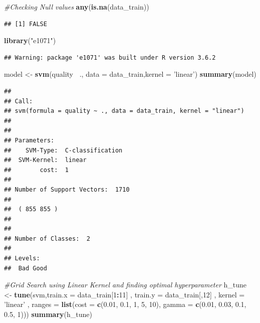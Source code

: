 \documentclass[]{article}
\newenvironment{Shaded}{\begin{snugshade}}{\end{snugshade}}
\newcommand{\CommentTok}[1]{\textcolor[rgb]{0.56,0.35,0.01}{\textit{#1}}}
\newcommand{\DataTypeTok}[1]{\textcolor[rgb]{0.13,0.29,0.53}{#1}}
\newcommand{\DecValTok}[1]{\textcolor[rgb]{0.00,0.00,0.81}{#1}}
\newcommand{\FloatTok}[1]{\textcolor[rgb]{0.00,0.00,0.81}{#1}}
\newcommand{\KeywordTok}[1]{\textcolor[rgb]{0.13,0.29,0.53}{\textbf{#1}}}
\newcommand{\NormalTok}[1]{#1}
\newcommand{\OperatorTok}[1]{\textcolor[rgb]{0.81,0.36,0.00}{\textbf{#1}}}
\newcommand{\StringTok}[1]{\textcolor[rgb]{0.31,0.60,0.02}{#1}}
\begin{document}
\begin{Shaded}
\begin{Highlighting}[]
\CommentTok{#Checking Null values}
\KeywordTok{any}\NormalTok{(}\KeywordTok{is.na}\NormalTok{(data_train))}
\end{Highlighting}
\end{Shaded}

\begin{verbatim}
## [1] FALSE
\end{verbatim}

\begin{Shaded}
\begin{Highlighting}[]
\KeywordTok{library}\NormalTok{(}\StringTok{"e1071"}\NormalTok{)}
\end{Highlighting}
\end{Shaded}

\begin{verbatim}
## Warning: package 'e1071' was built under R version 3.6.2
\end{verbatim}

\begin{Shaded}
\begin{Highlighting}[]
\NormalTok{model <-}\StringTok{ }\KeywordTok{svm}\NormalTok{(quality }\OperatorTok{~}\NormalTok{., }\DataTypeTok{data =}\NormalTok{ data_train,}\DataTypeTok{kernel =} \StringTok{'linear'}\NormalTok{)}
\KeywordTok{summary}\NormalTok{(model)}
\end{Highlighting}
\end{Shaded}

\begin{verbatim}
## 
## Call:
## svm(formula = quality ~ ., data = data_train, kernel = "linear")
## 
## 
## Parameters:
##    SVM-Type:  C-classification 
##  SVM-Kernel:  linear 
##        cost:  1 
## 
## Number of Support Vectors:  1710
## 
##  ( 855 855 )
## 
## 
## Number of Classes:  2 
## 
## Levels: 
##  Bad Good
\end{verbatim}

\begin{Shaded}
\begin{Highlighting}[]
\CommentTok{#Grid Search using Linear Kernel and finding optimal hyperparameter}
\NormalTok{h_tune <-}\StringTok{ }\KeywordTok{tune}\NormalTok{(svm,}\DataTypeTok{train.x =}\NormalTok{ data_train[}\DecValTok{1}\OperatorTok{:}\DecValTok{11}\NormalTok{] , }\DataTypeTok{train.y =}\NormalTok{ data_train[,}\DecValTok{12}\NormalTok{] ,}
               \DataTypeTok{kernel =} \StringTok{'linear'}\NormalTok{  ,}
               \DataTypeTok{ranges =} \KeywordTok{list}\NormalTok{(}\DataTypeTok{cost =} \KeywordTok{c}\NormalTok{(}\FloatTok{0.01}\NormalTok{, }\FloatTok{0.1}\NormalTok{, }\DecValTok{1}\NormalTok{, }\DecValTok{5}\NormalTok{, }\DecValTok{10}\NormalTok{), }\DataTypeTok{gamma =} \KeywordTok{c}\NormalTok{(}\FloatTok{0.01}\NormalTok{, }\FloatTok{0.03}\NormalTok{, }\FloatTok{0.1}\NormalTok{, }\FloatTok{0.5}\NormalTok{, }\DecValTok{1}\NormalTok{)))}
\KeywordTok{summary}\NormalTok{(h_tune)}
\end{Highlighting}
\end{Shaded}
\end{document}
